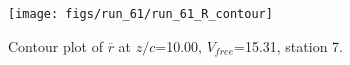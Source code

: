 \begin{figure}[H]
\centering
\texttt{[image: figs/run\_61/run\_61\_R\_contour]}
\caption{Contour plot of $\overline{r}$ at $z/c$=10.00, $V_{free}$=15.31, station 7.}
\end{figure}


